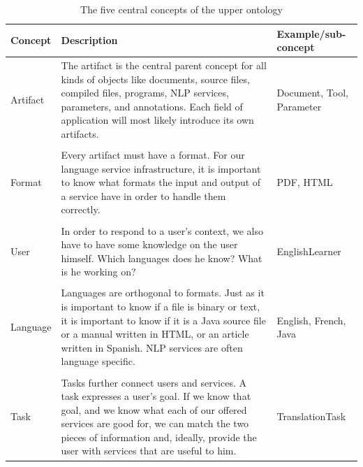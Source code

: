 \begin{table}[htb]
\centering\small\sffamily
\begin{tabular}{p{}@{\hspace*{4mm}}p{}@{\hspace*{4mm}}p{}}
  \toprule
  \textbf{Concept}&\textbf{Description} &\textbf{Example/sub-concept} \\
  \midrule
  Artifact &The artifact is the central parent concept for all
    kinds of objects like documents, source files, compiled files,
    programs, NLP services, parameters, and annotations. Each field of
    application will most likely introduce its own artifacts.&
    Document, Tool, Parameter\\

   & & \\
  
  Format &Every artifact must have a format. For our language
    service infrastructure, it is important to know what formats the
    input and output of a service have in order to handle them
    correctly. &PDF, HTML\\

   & & \\
  
  User & In order to respond to a user's context, we also have to
    have some knowledge on the user himself. Which 
    languages does he know? What is he working on? & EnglishLearner\\

   & & \\
  
   Language & Languages are orthogonal to formats. Just as it is
   important to know if a file is binary or text, it is important to
   know if it is a Java source file or a manual written in HTML, or
   an article written in Spanish. NLP services are often language
   specific.& English, French, Java\\

   & & \\
  
   Task & Tasks further connect users and services. A task expresses
   a user's goal. If we know that goal, and we know what each of our
   offered services are good for, we can  match the two pieces of
   information and, ideally, provide the user with services that are
   useful to him. & TranslationTask\\
   \bottomrule
\end{tabular}
\caption{The five central concepts of the upper ontology}
\label{tab:top5}
\end{table}

